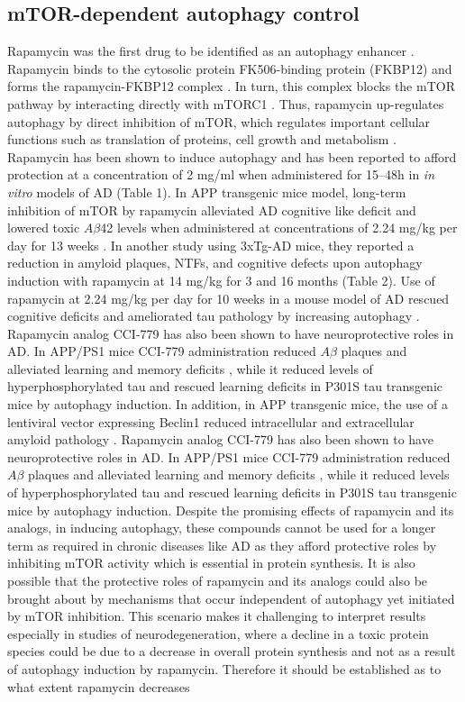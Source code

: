 \subsection{mTOR-dependent autophagy control}
Rapamycin was the first drug to be identified as an autophagy enhancer \citep{Blommaart1995,Noda1998}. Rapamycin binds to the cytosolic protein FK506-binding protein (FKBP12) and forms the rapamycin-FKBP12 complex \citep{Cardenas1995}. In turn, this complex blocks the mTOR pathway by interacting directly with mTORC1 \citep{Cardenas1995,Lorenz1995}. Thus, rapamycin up-regulates autophagy by direct inhibition of mTOR, which regulates important cellular functions such as translation of proteins, cell growth and metabolism \citep{Laplante2012,Polak2009}. Rapamycin has been shown to induce autophagy and has been reported to afford protection at a concentration of 2 mg/ml when administered for 15–48h in \textit{in vitro} models of AD \citep{Berger2006} (Table 1). In APP transgenic mice model, long-term inhibition of mTOR by rapamycin alleviated AD cognitive like deficit and lowered toxic $A\beta$42 levels when administered at concentrations of 2.24 mg/kg per day for 13 weeks \citep{Spilman2010}. In another study using 3xTg-AD mice, they reported a reduction in amyloid plaques, NTFs, and cognitive defects upon autophagy induction with rapamycin at 14 mg/kg for 3 and 16 months \citep{Majumder2011} (Table 2). Use of rapamycin at 2.24 mg/kg per day for 10 weeks in a mouse model of AD rescued cognitive deficits and ameliorated tau pathology by increasing autophagy \citep{Caccamo2010}. Rapamycin analog CCI-779 has also been shown to have neuroprotective roles in AD. In APP/PS1 mice CCI-779 administration reduced $A\beta$ plaques and alleviated learning and memory deficits \citep{Jiang2014a}, while it reduced levels of hyperphosphorylated tau and rescued learning deficits in P301S tau transgenic mice \citep{Jiang2014b} by autophagy induction. In addition, in APP transgenic mice, the use of a lentiviral vector expressing Beclin1 reduced intracellular and extracellular amyloid pathology \citep{Pickford2008}. Rapamycin analog CCI-779 has also been shown to have neuroprotective roles in AD. In APP/PS1 mice CCI-779 administration reduced $A\beta$ plaques and alleviated learning and memory deficits \citep{Jiang2014b}, while it reduced levels of hyperphosphorylated tau and rescued learning deficits in P301S tau transgenic mice \citep{Jiang2014a} by autophagy induction. Despite the promising effects of rapamycin and its analogs, in inducing autophagy, these compounds cannot be used for a longer term as required in chronic diseases like AD as they afford protective roles by inhibiting mTOR activity which is essential in protein synthesis. It is also possible that the protective roles of rapamycin and its analogs could also be brought about by mechanisms that occur independent of autophagy yet initiated by mTOR inhibition. This scenario makes it challenging to interpret results especially in studies of neurodegeneration, where a decline in a toxic protein species could be due to a decrease in overall protein synthesis and not as a result of autophagy induction by rapamycin. Therefore it should be established as to what extent rapamycin decreases 
